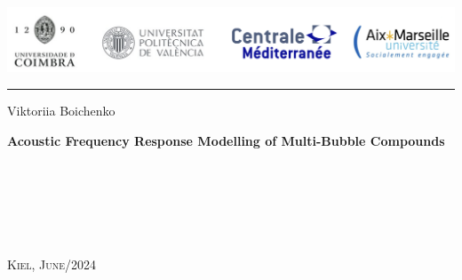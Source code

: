 \documentclass[a4paper,111pt]{article}
\begin{document}

\begin{titlepage}

\begin{minipage}{0.96\linewidth}
\centering
\includegraphics[width=\linewidth]{figures/universities.png}
\end{minipage}
\vspace{20pt}
\hrule
\vspace{5pt}

\begin{center}
    \vfill
    {
        \LARGE{}
        \vspace{0.5cm}
        \Large
    }   


    \vfill
    
    \Large{Viktoriia Boichenko}
    
    \vfill

    \LARGE\textbf{Acoustic Frequency Response Modelling of Multi-Bubble Compounds}
     \Large {}
\end{center}

\vfill

\begin{minipage}[t]{0.5\linewidth}
     \medskip\\
     \medskip\\
     \medskip\\
\end{minipage}
\begin{minipage}[t]{0.5\linewidth}
\end{minipage}

\vfill

\begin{minipage}[t]{0.5\linewidth}
    \textsc{} \medskip\\
\end{minipage}
\begin{minipage}[t]{0.5\linewidth}
    \large\textsc{Kiel, June/2024}\medskip\\
\end{minipage}

\end{titlepage}
%     
\end{document}
